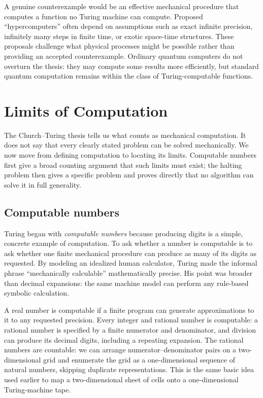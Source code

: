\documentclass[11pt]{article}
\begin{document}
A genuine counterexample would be an effective mechanical procedure that
computes a function no Turing machine can compute. Proposed ``hypercomputers''
often depend on assumptions such as exact infinite precision, infinitely many
steps in finite time, or exotic space-time structures. These proposals challenge
what physical processes might be possible rather than providing an accepted
counterexample. Ordinary quantum computers do not overturn the thesis: they may
compute some results more efficiently, but standard quantum computation remains
within the class of Turing-computable functions.

\section{Limits of Computation}

The Church--Turing thesis tells us what counts as mechanical computation. It
does not say that every clearly stated problem can be solved mechanically. We
now move from defining computation to locating its limits. Computable numbers
first give a broad counting argument that such limits must exist; the halting
problem then gives a specific problem and proves directly that no algorithm can
solve it in full generality.

\subsection{Computable numbers}

Turing began with \emph{computable numbers} because producing digits is a
simple, concrete example of computation. To ask whether a number is computable
is to ask whether one finite mechanical procedure can produce as many of its
digits as requested. By modeling an idealized human calculator, Turing made the
informal phrase ``mechanically calculable'' mathematically precise. His point
was broader than decimal expansions: the same machine model can perform any
rule-based symbolic calculation.

A real number is computable if a finite program can generate approximations to
it to any requested precision. Every integer and rational number is computable:
a rational number is specified by a finite numerator and denominator, and
division can produce its decimal digits, including a repeating expansion.
The rational numbers are countable: we can arrange numerator--denominator pairs
on a two-dimensional grid and enumerate the grid as a one-dimensional sequence
of natural numbers, skipping duplicate representations. This is the same basic
idea used earlier to map a two-dimensional sheet of cells onto a one-dimensional
Turing-machine tape.
\end{document}
